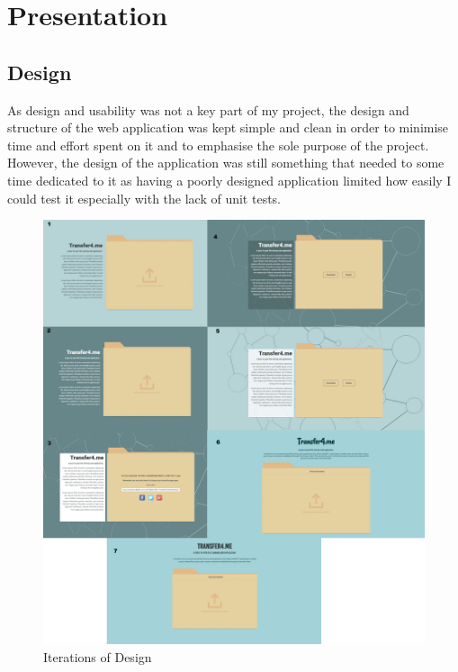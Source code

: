 \documentclass[]{report}
\begin{document}
		\section{Presentation}
			\subsection{Design}		
				As design and usability was not a key part of my project, the design and structure of the web application was kept simple and clean in order to minimise time and effort spent on it and to emphasise the sole purpose of the project. However, the design of the application was still something that needed to some time dedicated to it as having a poorly designed application limited how easily I could test it especially with the lack of unit tests.
				
				\begin{figure}[H]
					\caption{Iterations of Design}
					\centering
					\includegraphics[scale=0.15]{design.png}
				\end{figure}
				
\end{document}
